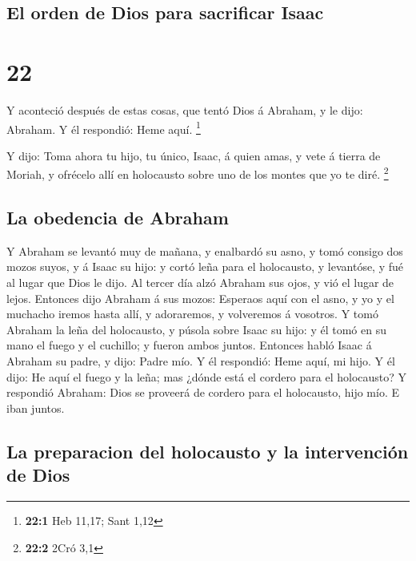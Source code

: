 \hypertarget{el-orden-de-dios-para-sacrificar-isaac}{%
\subsection{El orden de Dios para sacrificar
Isaac}\label{el-orden-de-dios-para-sacrificar-isaac}}

\hypertarget{section-21}{%
\section{22}\label{section-21}}

 Y aconteció después de estas cosas, que tentó Dios á
Abraham, y le dijo: Abraham. Y él respondió: Heme aquí. \footnote{\textbf{22:1}
  Heb 11,17; Sant 1,12}

 Y dijo: Toma ahora tu hijo, tu único, Isaac, á quien
amas, y vete á tierra de Moriah, y ofrécelo allí en holocausto sobre uno
de los montes que yo te diré. \footnote{\textbf{22:2} 2Cró 3,1}

\hypertarget{la-obedencia-de-abraham}{%
\subsection{La obedencia de Abraham}\label{la-obedencia-de-abraham}}

 Y Abraham se levantó muy de mañana, y enalbardó su asno,
y tomó consigo dos mozos suyos, y á Isaac su hijo: y cortó leña para el
holocausto, y levantóse, y fué al lugar que Dios le dijo. 
Al tercer día alzó Abraham sus ojos, y vió el lugar de lejos.
 Entonces dijo Abraham á sus mozos: Esperaos aquí con el
asno, y yo y el muchacho iremos hasta allí, y adoraremos, y volveremos á
vosotros.  Y tomó Abraham la leña del holocausto, y púsola
sobre Isaac su hijo: y él tomó en su mano el fuego y el cuchillo; y
fueron ambos juntos.  Entonces habló Isaac á Abraham su
padre, y dijo: Padre mío. Y él respondió: Heme aquí, mi hijo. Y él dijo:
He aquí el fuego y la leña; mas ¿dónde está el cordero para el
holocausto?  Y respondió Abraham: Dios se proveerá de
cordero para el holocausto, hijo mío. E iban juntos.

\hypertarget{la-preparacion-del-holocausto-y-la-intervenciuxf3n-de-dios}{%
\subsection{La preparacion del holocausto y la intervención de
Dios}\label{la-preparacion-del-holocausto-y-la-intervenciuxf3n-de-dios}}

